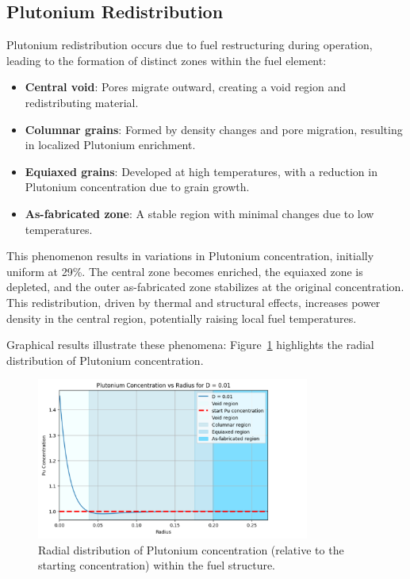 \documentclass[11pt,a4paper,twoside]{article}
\begin{document}
\subsection{Plutonium Redistribution}

Plutonium redistribution occurs due to fuel restructuring during operation, leading to the formation of distinct zones within the fuel element:

\begin{itemize}
    \item \textbf{Central void}: Pores migrate outward, creating a void region and redistributing material.
    \item \textbf{Columnar grains}: Formed by density changes and pore migration, resulting in localized Plutonium enrichment.
    \item \textbf{Equiaxed grains}: Developed at high temperatures, with a reduction in Plutonium concentration due to grain growth.
    \item \textbf{As-fabricated zone}: A stable region with minimal changes due to low temperatures.
\end{itemize}

This phenomenon results in variations in Plutonium concentration, initially uniform at 29\%. The central zone becomes enriched, the equiaxed zone is depleted, and the outer as-fabricated zone stabilizes at the original concentration. This redistribution, driven by thermal and structural effects, increases power density in the central region, potentially raising local fuel temperatures.

Graphical results illustrate these phenomena: Figure~\ref{fig:Pu_Profile} highlights the radial distribution of Plutonium concentration.

\begin{figure}[H]
\centering
\includegraphics[width=0.8\textwidth]{Pu_redistribution_profile.png}
\caption{Radial distribution of Plutonium concentration (relative to the starting concentration) within the fuel structure.}
\label{fig:Pu_Profile}
\end{figure}
\end{document}
